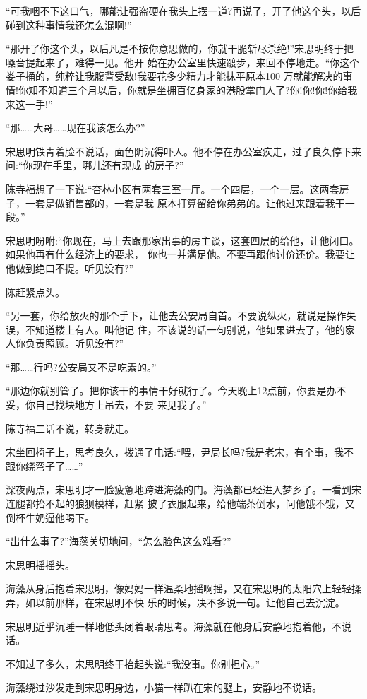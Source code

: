 \documentclass[11pt,a4paper,onecolumn]{article}
\begin{document}
``可我咽不下这口气，哪能让强盗硬在我头上摆一道?再说了，开了他这个头，以后碰到这种事情我还怎么混啊!''

``那开了你这个头，以后凡是不按你意思做的，你就干脆斩尽杀绝!''宋思明终于把嗓音提起来了，难得一见。他开
始在办公室里快速踱步，来回不停地走。``你这个娄子捅的，纯粹让我腹背受敌!我要花多少精力才能抹平原本100
万就能解决的事情!你知不知道三个月以后，你就是坐拥百亿身家的港股掌门人了?你!你!你!你给我来这一手!''

``那……大哥……现在我该怎么办?''

宋思明铁青着脸不说话，面色阴沉得吓人。他不停在办公室疾走，过了良久停下来问:``你现在手里，哪儿还有现成
的房子?''

陈寺福想了一下说:``杏林小区有两套三室一厅。一个四层，一个一层。这两套房子，一套是做销售部的，一套是我
原本打算留给你弟弟的。让他过来跟着我干一段。''

宋思明吩咐:``你现在，马上去跟那家出事的房主谈，这套四层的给他，让他闭口。如果他再有什么经济上的要求，
你也一并满足他。不要再跟他讨价还价。我要让他做到绝口不提。听见没有?''

陈赶紧点头。

``另一套，你给放火的那个手下，让他去公安局自首。不要说纵火，就说是操作失误，不知道楼上有人。叫他记
住，不该说的话一句别说，他如果进去了，他的家人你负责照顾。听见没有?''

``那……行吗?公安局又不是吃素的。''

``那边你就别管了。把你该干的事情干好就行了。今天晚上12点前，你要是办不妥，你自己找块地方上吊去，不要
来见我了。''

陈寺福二话不说，转身就走。

宋坐回椅子上，思考良久，拨通了电话:``喂，尹局长吗?我是老宋，有个事，我不跟你绕弯子了……''

深夜两点，宋思明才一脸疲惫地跨进海藻的门。海藻都已经进入梦乡了。一看到宋连腿都抬不起的狼狈模样，赶紧
披了衣服起来，给他端茶倒水，问他饿不饿，又倒杯牛奶逼他喝下。

``出什么事了?''海藻关切地问，``怎么脸色这么难看?''

宋思明摇摇头。

海藻从身后抱着宋思明，像妈妈一样温柔地摇啊摇，又在宋思明的太阳穴上轻轻揉弄，如以前那样，在宋思明不快
乐的时候，决不多说一句。让他自己去沉淀。

宋思明近乎沉睡一样地低头闭着眼睛思考。海藻就在他身后安静地抱着他，不说话。

不知过了多久，宋思明终于抬起头说:``我没事。你别担心。''

海藻绕过沙发走到宋思明身边，小猫一样趴在宋的腿上，安静地不说话。
\end{document}

